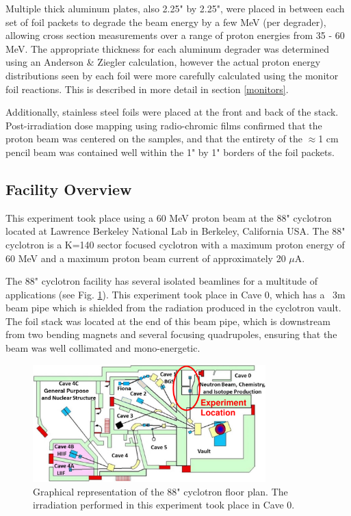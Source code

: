 \documentclass[aps,superscriptaddress,twocolumn,secnumarabic,balancelastpage,amsmath,amssymb,nofootinbib,floatfix]{revtex4-1}
\begin{document}
Multiple thick aluminum plates, also 2.25" by 2.25", were placed in between each set of foil packets to degrade the beam energy by a few MeV (per degrader), allowing cross section measurements over a range of proton energies from 35 - 60 MeV.  The appropriate thickness for each aluminum degrader was determined using an Anderson \& Ziegler calculation, however the actual proton energy distributions seen by each foil were more carefully calculated using the monitor foil reactions.  This is described in more detail in section \ref{monitors}.

Additionally, stainless steel foils were placed at the front and back of the stack.  Post-irradiation dose mapping using radio-chromic films confirmed that the proton beam was centered on the samples, and that the entirety of the $\approx$1 cm pencil beam was contained well within the 1" by 1" borders of the foil packets.

\subsection{Facility Overview}
This experiment took place using a 60 MeV proton beam at the 88" cyclotron located at Lawrence Berkeley National Lab in Berkeley, California USA.  The 88" cyclotron is a K=140 sector focused cyclotron with a maximum proton energy of 60 MeV and a maximum proton beam current of approximately 20 $\mu$A.

The 88" cyclotron facility has several isolated beamlines for a multitude of applications (see Fig. \ref{fig:cyclotron}).  This experiment took place in Cave 0, which has a ~3m beam pipe which is shielded from the radiation produced in the cyclotron vault.  The foil stack was located at the end of this beam pipe, which is downstream from two bending magnets and several focusing quadrupoles, ensuring that the beam was well collimated and mono-energetic.

\begin{figure}[htb]
\includegraphics[width=9cm]{photos/cyclotron.png}
\caption{Graphical representation of the 88" cyclotron floor plan.  The irradiation performed in this experiment took place in Cave 0.
}
\label{fig:cyclotron}
\end{figure}
\end{document}
